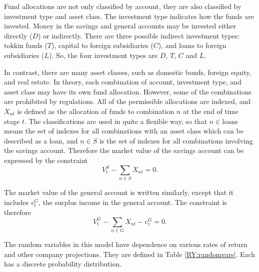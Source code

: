Fund allocations are not only classified by account, they are also classified by investment type and asset class.  The investment type indicates how the funds are invested.  Money in the savings and general accounts may be invested either directly ($D$) or indirectly.  There are three possible indirect investment types:  tokkin funds ($T$), capital to foreign subsidiaries ($C$), and loans to foreign subsidiaries ($L$).  So, the four investment types are $D$, $T$, $C$ and $L$.  

In contrast, there are many asset classes, such as domestic bonds, foreign equity, and real estate.  In theory, each combination of account, investment type, and asset class may have its own fund allocation.  However, some of the combinations are prohibited by regulations.  All of the permissible allocations are indexed, and $X_{nt}$ is defined as the allocation of funds to combination $n$ at the end of time stage $t$.  The classifications are used in quite a flexible way, so that $n \in \mbox{loans}$ means the set of indexes for all combinations with an asset class which can be described as a loan, and $n \in S$ is the set of indexes for all combinations involving the savings account.  Therefore the market value of the savings account can be expressed by the constraint
\begin{equation}
\label{RY:allocsav}
V^S_t - \sum_{n\in S} X_{nt} = 0.
\end{equation}

The market value of the general account is written similarly, except that it includes $v_t^G$, the surplus income in the general account.  The constraint is therefore
\begin{equation*}
V^G_t - \sum_{n \in G} X_{nt} - v_t^G = 0.
\end{equation*}

The random variables in this model have dependence on various rates of return and other company projections.  They are defined in Table \ref{RY:randomvars}.  Each has a discrete probability distribution.

